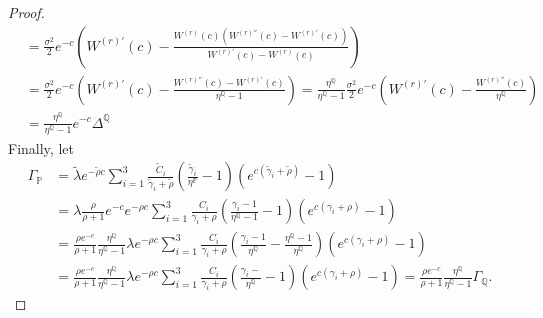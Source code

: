 \documentclass[10pt,a4paper]{amsart}
\def\P{{\mathbb{P}}}
\def\Q{{\mathbb{Q}}}
\def\P{{\mathbb P}} \def\le{\left} \def\ri{\right} \def\i{\infty}
\begin{document}
\begin{proof}
\begin{align*}
				\nonumber &= \frac{\sigma^2}{2} e^{-c} \left( W^{(r)'}(c) -  \frac{W^{(r)}(c)\left( W^{(r)''}(c) -W^{(r)'}(c)  \right)}{W^{(r)'}(c) - W^{(r)}(c)} \right) \\
				\nonumber &= \frac{\sigma^2}{2} e^{-c} \left( W^{(r)'}(c) -  \frac{ W^{(r)''}(c) -W^{(r)'}(c)  }{\eta^\Q-1} \right) = \frac{\eta^\Q}{\eta^\Q-1} \frac{\sigma^2}{2} e^{-c} \left( W^{(r)'}(c) - \frac{W^{(r)''}(c)}{\eta^\Q} \right) \\
				\nonumber &=  \frac{\eta^\Q}{\eta^\Q-1} e^{-c} \Delta^\Q
			\end{align*}
			Finally, let
			\begin{align*}
				\Gamma_\P &= \tilde{\lambda} e^{-\tilde{\rho} c} \sum_{i=1}^3 \frac{\tilde{C}_i}{\tilde{\gamma}_i + \tilde{\rho}} \left( \frac{\tilde{\gamma}_i}{\eta^\P}-1\right)\left(e^{c(\tilde{\gamma}_i+\tilde{\rho})}-1\right) \\
				\nonumber &= \lambda \frac{\rho}{\rho+1} e^{-c} e^{-\rho c} \sum_{i=1}^3 \frac{C_i}{\gamma_i + \rho} \left( \frac{\gamma_i-1}{\eta^\Q-1}-1\right)\left(e^{c(\gamma_i+\rho)}-1\right) \\
				\nonumber &=  \frac{\rho e^{-c}}{\rho+1} \frac{\eta^\Q}{\eta^\Q-1}  \lambda e^{-\rho c} \sum_{i=1}^3 \frac{C_i}{\gamma_i + \rho} \left( \frac{\gamma_i-1}{\eta^\Q}-\frac{\eta^\Q-1}{\eta^\Q}\right)\left(e^{c(\gamma_i+\rho)}-1\right) \\
				\nonumber &=  \frac{\rho e^{-c}}{\rho+1} \frac{\eta^\Q}{\eta^\Q-1}  \lambda e^{-\rho c} \sum_{i=1}^3 \frac{C_i}{\gamma_i + \rho} \left( \frac{\gamma_i-}{\eta^\Q}-1\right)\left(e^{c(\gamma_i+\rho)}-1\right) = \frac{\rho e^{-c}}{\rho+1} \frac{\eta^\Q}{\eta^\Q-1} \Gamma_\Q.
			\end{align*}
			

\end{proof}
\end{document}
